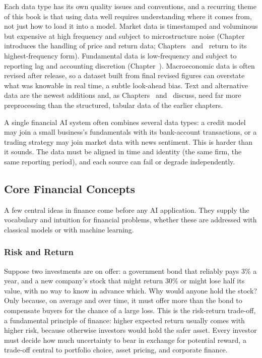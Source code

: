 \documentclass[../ai_in_finance]{subfiles}
\begin{document}
Each data type has its own quality issues and conventions, and a recurring theme of this book is that using data well requires understanding where it comes from, not just how to load it into a model. Market data is timestamped and voluminous but expensive at high frequency and subject to microstructure noise (Chapter~ introduces the handling of price and return data; Chapters~ and~ return to its highest-frequency form). Fundamental data is low-frequency and subject to reporting lag and accounting discretion (Chapter~).
Macroeconomic data is often revised after release, so a dataset built from final revised figures can overstate what was knowable in real time, a subtle look-ahead bias. Text and alternative data are the newest additions and, as Chapters~ and~ discuss, need far more preprocessing than the structured, tabular data of the earlier chapters.

A single financial AI system often combines several data types: a credit model may join a small business's fundamentals with its bank-account transactions, or a trading strategy may join market data with news sentiment. This is harder than it sounds. The data must be aligned in time and identity (the same firm, the same reporting period), and each source can fail or degrade independently.

\subsection{Core Financial Concepts}

A few central ideas in finance come before any AI application. They supply the vocabulary and intuition for financial problems, whether these are addressed with classical models or with machine learning.

\subsubsection*{Risk and Return}

Suppose two investments are on offer: a government bond that reliably pays 3\% a year, and a new company's stock that might return 30\% or might lose half its value, with no way to know in advance which. Why would anyone hold the stock? Only because, on average and over time, it must offer more than the bond to compensate buyers for the chance of a large loss. This is the risk-return trade-off, a fundamental principle of finance: higher expected return usually comes with higher risk, because otherwise investors would hold the safer asset. Every investor must decide how much uncertainty to bear in exchange for potential reward, a trade-off central to portfolio choice, asset pricing, and corporate finance.
\end{document}

